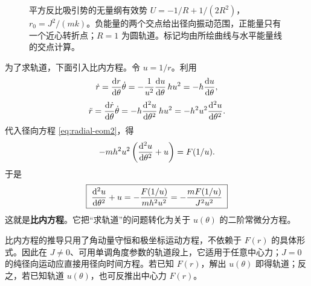\begin{figure}[htbp]
\centering
{}
\caption{平方反比吸引势的无量纲有效势 $U=-1/R+1/(2R^2)$，$r_0=J^2/(mk)$。负能量的两个交点给出径向振动范围，正能量只有一个近心转折点；$R=1$ 为圆轨道。标记均由所绘曲线与水平能量线的交点计算。}
\label{fig:effective-potential}
\end{figure}

为了求轨道，下面引入比内方程。令 $u=1/r$。利用
\begin{equation}
\dot r=\dv{r}{\theta}\dot\theta
=-\frac{1}{u^2}\dv{u}{\theta}\,hu^2
=-h\dv{u}{\theta},
\end{equation}
\begin{equation}
\ddot r=\dv{\dot r}{\theta}\dot\theta
=-h\dvv[2]{u}{\theta}\,hu^2
=-h^2u^2\dvv[2]{u}{\theta}.
\end{equation}
代入径向方程 \eqref{eq:radial-eom2}，得
\begin{equation}
-mh^2u^2\left(\dvv[2]{u}{\theta}+u\right)=F(1/u).
\end{equation}
于是
\begin{equation}
\boxed{\;\dvv[2]{u}{\theta}+u
=-\frac{F(1/u)}{mh^2u^2}
=-\frac{mF(1/u)}{J^2u^2}\;}
\label{eq:binet}
\end{equation}
这就是\textbf{比内方程}。它把“求轨道”的问题转化为关于 $u(\theta)$ 的二阶常微分方程。

\begin{mathbox}
比内方程的推导只用了角动量守恒和极坐标运动方程，不依赖于 $F(r)$ 的具体形式。因此在 $J\ne0$、可用单调角度参数的轨道段上，它适用于任意中心力；$J=0$ 的纯径向运动应直接用径向时间方程。若已知 $F(r)$，解出 $u(\theta)$ 即得轨道；反之，若已知轨道 $u(\theta)$，也可反推出中心力 $F(r)$。
\end{mathbox}

